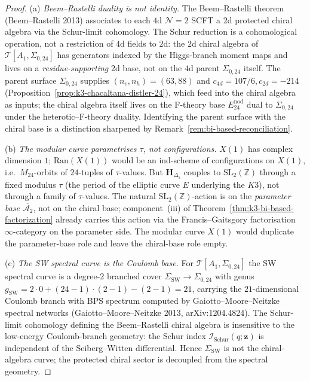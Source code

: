 \begin{proof}
\textup{(a)} \emph{Beem--Rastelli duality is not identity.} The
Beem--Rastelli theorem (Beem--Rastelli 2013) associates to each $4$d
$\mathcal{N}=2$ SCFT a $2$d protected chiral algebra via the
Schur-limit cohomology. The Schur reduction is a cohomological
operation, not a restriction of $4$d fields to $2$d: the $2$d chiral
algebra of $\mathcal{T}[A_1,\Sigma_{0,24}]$ has generators indexed by
the Higgs-branch moment maps and lives on a \emph{residue-supporting}
$2$d base, not on the $4$d parent $\Sigma_{0,24}$ itself. The parent
surface $\Sigma_{0,24}$ supplies $(n_v,n_h) = (63,88)$ and
$c_{4d} = 107/6, c_{2d} = -214$
(Proposition~\ref{prop:k3-chacaltana-distler-24}), which feed into the
chiral algebra as inputs; the chiral algebra itself lives on the
F-theory base $E^{\mathrm{nod}}_{24}$ dual to $\Sigma_{0,24}$ under the
heterotic--F-theory duality. Identifying the parent surface with the
chiral base is a distinction sharpened by
Remark~\ref{rem:bi-based-reconciliation}.

\textup{(b)} \emph{The modular curve parametrises $\tau$, not
configurations.} $X(1)$ has complex dimension $1$; $\mathrm{Ran}(X(1))$
would be an ind-scheme of configurations on $X(1)$, i.e.\ $M_{24}$-orbits
of $24$-tuples of $\tau$-values. But $\mathbf{H}_{\Delta_5}$ couples to
$\mathrm{SL}_2(\mathbb{Z})$ through a fixed modulus $\tau$ (the period
of the elliptic curve $E$ underlying the $K3$), not through a family of
$\tau$-values. The natural $\mathrm{SL}_2(\mathbb{Z})$-action is on the
\emph{parameter base} $\overline{\mathcal{A}_2}$, not on the chiral
base; component~(iii) of
Theorem~\ref{thm:k3-bi-based-factorization} already carries this action
via the Francis--Gaitsgory factorisation $\infty$-category on the
parameter side. The modular curve $X(1)$ would duplicate the
parameter-base role and leave the chiral-base role empty.

\textup{(c)} \emph{The SW spectral curve is the Coulomb base.} For
$\mathcal{T}[A_1,\Sigma_{0,24}]$ the SW spectral curve is a degree-$2$
branched cover
$\Sigma_{\mathrm{SW}}\to\Sigma_{0,24}$ with genus $g_{\mathrm{SW}}
= 2\cdot 0 + (24-1)\cdot (2-1) - (2-1) = 21$, carrying the
$21$-dimensional Coulomb branch with BPS spectrum computed by
Gaiotto--Moore--Neitzke spectral networks (Gaiotto--Moore--Neitzke 2013,
arXiv:1204.4824). The Schur-limit cohomology defining the
Beem--Rastelli chiral algebra is insensitive to the low-energy
Coulomb-branch geometry: the Schur index
$\mathcal{I}_{\mathrm{Schur}}(q;\mathbf{z})$ is independent of the
Seiberg--Witten differential. Hence $\Sigma_{\mathrm{SW}}$ is not the
chiral-algebra curve; the protected chiral sector is decoupled from
the spectral geometry.
\end{proof}

